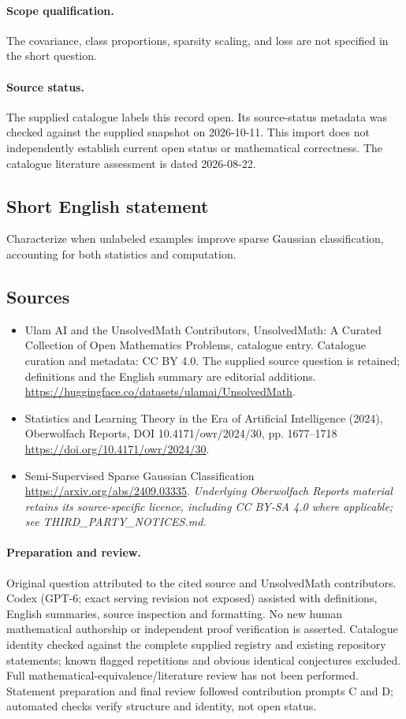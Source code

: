 \documentclass[11pt]{article}
\begin{document}
\paragraph{Scope qualification.}
The covariance, class proportions, sparsity scaling, and loss are not specified in the short question.
\paragraph{Source status.}
The supplied catalogue labels this record open. Its source-status metadata was checked against the supplied snapshot on 2026-10-11. This import does not independently establish current open status or mathematical correctness. The catalogue literature assessment is dated 2026-08-22.
\subsection{Short English statement}
Characterize when unlabeled examples improve sparse Gaussian classification, accounting for both statistics and computation.
\subsection{Sources}
\begin{itemize}
\item[S1] Ulam AI and the UnsolvedMath Contributors, UnsolvedMath: A Curated Collection of Open Mathematics Problems, catalogue entry. Catalogue curation and metadata: CC BY 4.0. The supplied source question is retained; definitions and the English summary are editorial additions.
\url{https://huggingface.co/datasets/ulamai/UnsolvedMath}.
\item[S2] Statistics and Learning Theory in the Era of Artificial Intelligence (2024), Oberwolfach Reports, DOI 10.4171/owr/2024/30, pp. 1677--1718
\url{https://doi.org/10.4171/owr/2024/30}.
\item[S3] Semi-Supervised Sparse Gaussian Classification
\url{https://arxiv.org/abs/2409.03335}.
\textit{Underlying Oberwolfach Reports material retains its source-specific licence, including CC BY-SA 4.0 where applicable; see THIRD\_PARTY\_NOTICES.md.}
\end{itemize}
\paragraph{Preparation and review.}
Original question attributed to the cited source and UnsolvedMath contributors. Codex (GPT-6; exact serving revision not exposed) assisted with definitions, English summaries, source inspection and formatting. No new human mathematical authorship or independent proof verification is asserted. Catalogue identity checked against the complete supplied registry and existing repository statements; known flagged repetitions and obvious identical conjectures excluded. Full mathematical-equivalence/literature review has not been performed. Statement preparation and final review followed contribution prompts C and D; automated checks verify structure and identity, not open status.
\label{end:statement}
\end{document}
